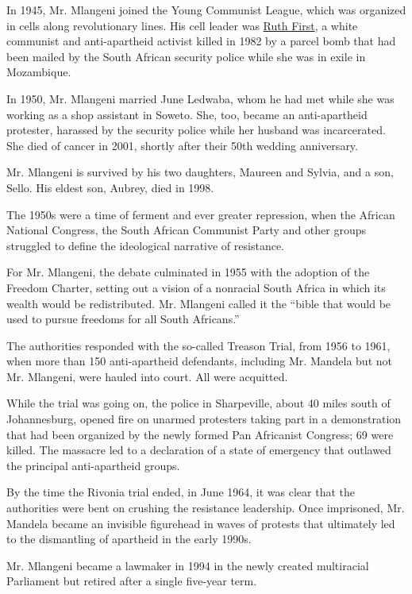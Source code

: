 In 1945, Mr. Mlangeni joined the Young Communist League, which was
organized in cells along revolutionary lines. His cell leader was
\href{https://www.sahistory.org.za/people/ruth-heloise-first}{Ruth
First}, a white communist and anti-apartheid activist killed in 1982 by
a parcel bomb that had been mailed by the South African security police
while she was in exile in Mozambique.

In 1950, Mr. Mlangeni married June Ledwaba, whom he had met while she
was working as a shop assistant in Soweto. She, too, became an
anti-apartheid protester, harassed by the security police while her
husband was incarcerated. She died of cancer in 2001, shortly after
their 50th wedding anniversary.

Mr. Mlangeni is survived by his two daughters, Maureen and Sylvia, and a
son, Sello. His eldest son, Aubrey, died in 1998.

The 1950s were a time of ferment and ever greater repression, when the
African National Congress, the South African Communist Party and other
groups struggled to define the ideological narrative of resistance.

For Mr. Mlangeni, the debate culminated in 1955 with the adoption of the
Freedom Charter, setting out a vision of a nonracial South Africa in
which its wealth would be redistributed. Mr. Mlangeni called it the
``bible that would be used to pursue freedoms for all South Africans.''

The authorities responded with the so-called Treason Trial, from 1956 to
1961, when more than 150 anti-apartheid defendants, including Mr.
Mandela but not Mr. Mlangeni, were hauled into court. All were
acquitted.

While the trial was going on, the police in Sharpeville, about 40 miles
south of Johannesburg, opened fire on unarmed protesters taking part in
a demonstration that had been organized by the newly formed Pan
Africanist Congress; 69 were killed. The massacre led to a declaration
of a state of emergency that outlawed the principal anti-apartheid
groups.

By the time the Rivonia trial ended, in June 1964, it was clear that the
authorities were bent on crushing the resistance leadership. Once
imprisoned, Mr. Mandela became an invisible figurehead in waves of
protests that ultimately led to the dismantling of apartheid in the
early 1990s.

Mr. Mlangeni became a lawmaker in 1994 in the newly created multiracial
Parliament but retired after a single five-year term.

